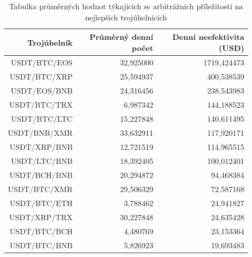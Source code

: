 \begin{table}\centering
\caption{Tabulka průměrných hodnot týkajících se arbitrážních příležitostí na nejlepších trojúhelnících}
\label{table_combined_best}
\begin{tabular}{|| r | r | r ||}\hline Trojúhelník & Průměrný denní počet & Denní neefektivita (USD)\\ [0.5ex]
 \hline\hline USDT/BTC/EOS & 32,925000 & 1719,424473\\ 
 \hline USDT/BTC/XRP & 25,594937 & 400,538539\\ 
 \hline USDT/EOS/BNB & 24,316456 & 238,543983\\ 
 \hline USDT/BTC/TRX & 6,987342 & 144,188523\\ 
 \hline USDT/BTC/LTC & 15,227848 & 140,611495\\ 
 \hline USDT/BNB/XMR & 33,632911 & 117,920171\\ 
 \hline USDT/XRP/BNB & 12,721519 & 114,965515\\ 
 \hline USDT/LTC/BNB & 18,392405 & 100,012401\\ 
 \hline USDT/BCH/BNB & 20,294872 & 94,468384\\ 
 \hline USDT/BTC/XMR & 29,506329 & 72,587168\\ 
 \hline USDT/BTC/ETH & 3,788462 & 24,941827\\ 
 \hline USDT/XRP/TRX & 30,227848 & 24,635428\\ 
 \hline USDT/BTC/BCH & 4,480769 & 23,153364\\ 
 \hline USDT/BTC/BNB & 5,826923 & 19,693483\\ 
 \hline
\end{tabular}
\end{table}